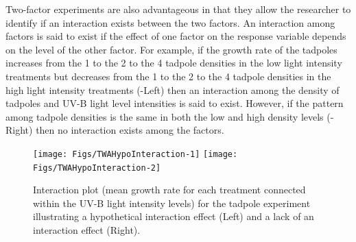 \documentclass[10pt,openany]{book}\usepackage[]{graphicx}\usepackage[]{color}
\newenvironment{knitrout}{}{} %
\begin{document}

Two-factor experiments are also advantageous in that they allow the researcher to identify if an interaction exists between the two factors.  An interaction among factors is said to exist if the effect of one factor on the response variable depends on the level of the other factor.  For example, if the growth rate of the tadpoles increases from the 1 to the 2 to the 4 tadpole densities in the low light intensity treatments but decreases from the 1 to the 2 to the 4 tadpole densities in the high light intensity treatments (-Left) then an interaction among the density of tadpoles and UV-B light level intensities is said to exist.  However, if the pattern among tadpole densities is the same in both the low and high density levels (-Right) then no interaction exists among the factors.


\vspace{-12pt}

\begin{knitrout}
\color{fgcolor}\begin{figure}[h]

{\centering \texttt{[image: Figs/TWAHypoInteraction-1]} 
\texttt{[image: Figs/TWAHypoInteraction-2]} 

}

\caption[Interaction plot (mean growth rate for each treatment connected within the UV-B light intensity levels) for the tadpole experiment illustrating a hypothetical interaction effect (Left) and a lack of an interaction effect (Right)]{Interaction plot (mean growth rate for each treatment connected within the UV-B light intensity levels) for the tadpole experiment illustrating a hypothetical interaction effect (Left) and a lack of an interaction effect (Right).}\label{fig:TWAHypoInteraction}
\end{figure}


\end{knitrout}
\end{document}
